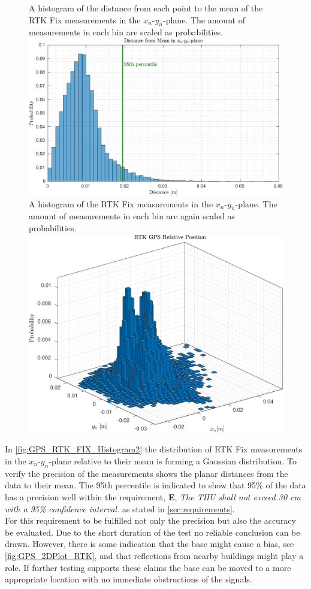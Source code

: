 \begin{figure}[H]
  \captionbox
  {
    A histogram of the distance from each point to the mean of the RTK Fix measurements in the $x_n$-$y_n$-plane. The amount of measurements in each bin are scaled as probabilities.
    \label{fig:GPS_RTK_FIX_Histogram}
  }
  {
    \includegraphics[width=.50\textwidth]{figures/GPS_RTK_Fix_Histogram}
  }
  \hspace{5pt}
  \captionbox
  {
    A histogram of the RTK Fix measurements in the $x_n$-$y_n$-plane. The amount of measurements in each bin are again scaled as probabilities.
    \label{fig:GPS_RTK_FIX_Histogram2}
  }
  {
    \includegraphics[width=.43\textwidth]{figures/GPS_RTK_Fix_Histogram2}
  }
\end{figure}

In \autoref{fig:GPS_RTK_FIX_Histogram2} the distribution of RTK Fix measurements in the $x_n$-$y_n$-plane relative to their mean is forming a Gaussian distribution. To verify the precision of the measurements shows the planar distances from the data to their mean. The 95th percentile is indicated to show that 95$\%$ of the data has a precision well within the requirement, \textbf{E}, \emph{The THU shall not exceed 30 cm with a 95\% confidence interval.} as stated in \autoref{sec:requirements}.\\
For this requirement to be fulfilled not only the precision but also the accuracy be evaluated. Due to the short duration of the test no reliable conclusion can be drawn. However, there is some indication that the base might cause a bias, see \autoref{fig:GPS_2DPlot_RTK}, and that reflections from nearby buildings might play a role. If further testing supports these claims the base can be moved to a more appropriate location with no immediate obstructions of the signals.


